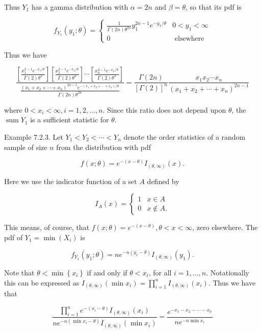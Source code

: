 Thus $Y_{1}$ has a gamma distribution with $\alpha=2 n$ and $\beta=\theta$, so that its pdf is

$$
f_{Y_{1}}\left(y_{1} ; \theta\right)= \begin{cases}\frac{1}{\Gamma(2 n) \theta^{2 n}} y_{1}^{2 n-1} e^{-y_{1} / \theta} & 0<y_{1}<\infty \\ 0 & \text { elsewhere }\end{cases}
$$

Thus we have

$$
\frac{\left[\frac{x_{1}^{2-1} e^{-x_{1} / \theta}}{\Gamma(2) \theta^{2}}\right]\left[\frac{x_{2}^{2-1} e^{-x_{2} / \theta}}{\Gamma(2) \theta^{2}}\right] \cdots\left[\frac{x_{n}^{2-1} e^{-x_{n} / \theta}}{\Gamma(2) \theta^{2}}\right]}{\frac{\left(x_{1}+x_{2}+\cdots+x_{n}\right)^{2 n-1} e^{-\left(x_{1}+x_{2}+\cdots+x_{n}\right) / \theta}}{\Gamma(2 n) \theta^{2 n}}}=\frac{\Gamma(2 n)}{[\Gamma(2)]^{n}} \frac{x_{1} x_{2} \cdots x_{n}}{\left(x_{1}+x_{2}+\cdots+x_{n}\right)^{2 n-1}}
$$

where $0<x_{i}<\infty, i=1,2, \ldots, n$. Since this ratio does not depend upon $\theta$, the $\operatorname{sum} Y_{1}$ is a sufficient statistic for $\theta$.

Example 7.2.3. Let $Y_{1}<Y_{2}<\cdots<Y_{n}$ denote the order statistics of a random sample of size $n$ from the distribution with pdf

$$
f(x ; \theta)=e^{-(x-\theta)} I_{(\theta, \infty)}(x) .
$$

Here we use the indicator function of a set $A$ defined by

$$
I_{A}(x)= \begin{cases}1 & x \in A \\ 0 & x \notin A .\end{cases}
$$

This means, of course, that $f(x ; \theta)=e^{-(x-\theta)}, \theta<x<\infty$, zero elsewhere. The pdf of $Y_{1}=\min \left(X_{i}\right)$ is

$$
f_{Y_{1}}\left(y_{1} ; \theta\right)=n e^{-n\left(y_{1}-\theta\right)} I_{(\theta, \infty)}\left(y_{1}\right) .
$$

Note that $\theta<\min \left\{x_{i}\right\}$ if and only if $\theta<x_{i}$, for all $i=1, \ldots, n$. Notationally this can be expressed as $I_{(\theta, \infty)}\left(\min x_{i}\right)=\prod_{i=1}^{n} I_{(\theta, \infty)}\left(x_{i}\right)$. Thus we have that

$$
\frac{\prod_{i=1}^{n} e^{-\left(x_{i}-\theta\right)} I_{(\theta, \infty)}\left(x_{i}\right)}{n e^{-n\left(\min x_{i}-\theta\right)} I_{(\theta, \infty)}\left(\min x_{i}\right)}=\frac{e^{-x_{1}-x_{2}-\cdots-x_{n}}}{n e^{-n \min x_{i}}}
$$

